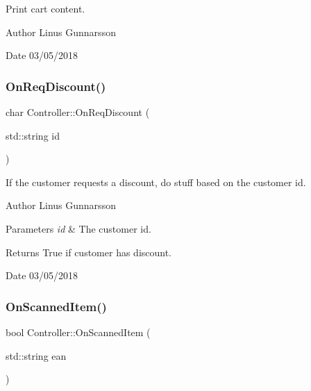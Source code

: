 Print cart content. \begin{DoxyAuthor}{Author}
Linus Gunnarsson 
\end{DoxyAuthor}
\begin{DoxyDate}{Date}
03/05/2018 
\end{DoxyDate}
\mbox{\label{classController_a72bf65a5fee35f140e4890d5dd3fd839}} 
\subsubsection{\texorpdfstring{On\+Req\+Discount()}{OnReqDiscount()}}
{\footnotesize\ttfamily char Controller\+::\+On\+Req\+Discount (\begin{DoxyParamCaption}\item[{std\+::string}]{id }\end{DoxyParamCaption})}

If the customer requests a discount, do stuff based on the customer id. \begin{DoxyAuthor}{Author}
Linus Gunnarsson 
\end{DoxyAuthor}

\begin{DoxyParams}{Parameters}
{\em id} & The customer id. \\
\hline
\end{DoxyParams}
\begin{DoxyReturn}{Returns}
True if customer has discount. 
\end{DoxyReturn}
\begin{DoxyDate}{Date}
03/05/2018 
\end{DoxyDate}
\mbox{\label{classController_a89f3bf717eacccece51eb0e18a4727e1}} 
\subsubsection{\texorpdfstring{On\+Scanned\+Item()}{OnScannedItem()}}
{\footnotesize\ttfamily bool Controller\+::\+On\+Scanned\+Item (\begin{DoxyParamCaption}\item[{std\+::string}]{ean }\end{DoxyParamCaption})}

